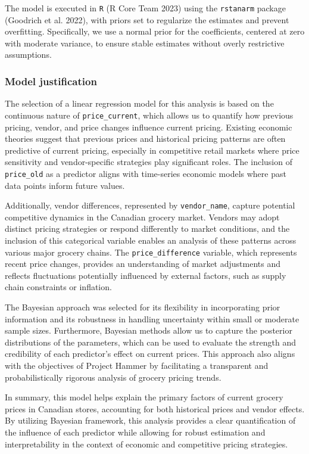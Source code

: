 \documentclass[
  letterpaper,
  DIV=11,
  numbers=noendperiod]{scrartcl}
\begin{document}
The model is executed in \texttt{R} (R Core Team 2023) using the
\texttt{rstanarm} package (Goodrich et al. 2022), with priors set to
regularize the estimates and prevent overfitting. Specifically, we use a
normal prior for the coefficients, centered at zero with moderate
variance, to ensure stable estimates without overly restrictive
assumptions.

\subsubsection{Model justification}\label{model-justification}

The selection of a linear regression model for this analysis is based on
the continuous nature of \texttt{price\_current}, which allows us to
quantify how previous pricing, vendor, and price changes influence
current pricing. Existing economic theories suggest that previous prices
and historical pricing patterns are often predictive of current pricing,
especially in competitive retail markets where price sensitivity and
vendor-specific strategies play significant roles. The inclusion of
\texttt{price\_old} as a predictor aligns with time-series economic
models where past data points inform future values.

Additionally, vendor differences, represented by \texttt{vendor\_name},
capture potential competitive dynamics in the Canadian grocery market.
Vendors may adopt distinct pricing strategies or respond differently to
market conditions, and the inclusion of this categorical variable
enables an analysis of these patterns across various major grocery
chains. The \texttt{price\_difference} variable, which represents recent
price changes, provides an understanding of market adjustments and
reflects fluctuations potentially influenced by external factors, such
as supply chain constraints or inflation.

The Bayesian approach was selected for its flexibility in incorporating
prior information and its robustness in handling uncertainty within
small or moderate sample sizes. Furthermore, Bayesian methods allow us
to capture the posterior distributions of the parameters, which can be
used to evaluate the strength and credibility of each predictor's effect
on current prices. This approach also aligns with the objectives of
Project Hammer by facilitating a transparent and probabilistically
rigorous analysis of grocery pricing trends.

In summary, this model helps explain the primary factors of current
grocery prices in Canadian stores, accounting for both historical prices
and vendor effects. By utilizing Bayesian framework, this analysis
provides a clear quantification of the influence of each predictor while
allowing for robust estimation and interpretability in the context of
economic and competitive pricing strategies.
\end{document}
